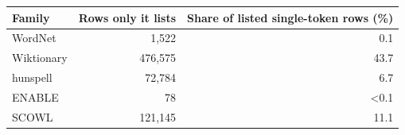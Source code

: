 \begin{tabular}{lrr}
\toprule
Family & Rows only it lists & Share of listed single-token rows (\%) \\
\midrule
WordNet & 1,522 & 0.1 \\
Wiktionary & 476,575 & 43.7 \\
hunspell & 72,784 & 6.7 \\
ENABLE & 78 & <0.1 \\
SCOWL & 121,145 & 11.1 \\
\bottomrule
\end{tabular}
